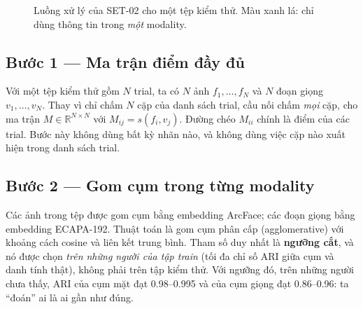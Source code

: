 \documentclass[11pt,a4paper]{article}
\newcommand{\key}[1]{\textbf{\color{accent}#1}}
\begin{document}
\begin{figure}[h]
\centering
{}
\caption{Luồng xử lý của SET-02 cho một tệp kiểm thử. Màu xanh lá: chỉ dùng thông tin trong \emph{một} modality.}
\end{figure}

\subsection{Bước 1 --- Ma trận điểm đầy đủ}
Với một tệp kiểm thử gồm $N$ trial, ta có $N$ ảnh $f_1,\dots,f_N$ và $N$ đoạn giọng $v_1,\dots,v_N$. Thay vì chỉ chấm $N$ cặp của danh sách trial, cầu nối chấm \emph{mọi} cặp, cho ma trận $M\in\mathbb{R}^{N\times N}$ với $M_{ij}=s(f_i,v_j)$. Đường chéo $M_{ii}$ chính là điểm của các trial. Bước này không dùng bất kỳ nhãn nào, và không dùng việc cặp nào xuất hiện trong danh sách trial.

\subsection{Bước 2 --- Gom cụm trong từng modality}
Các ảnh trong tệp được gom cụm bằng embedding ArcFace; các đoạn giọng bằng embedding ECAPA-192. Thuật toán là gom cụm phân cấp (agglomerative) với khoảng cách cosine và liên kết trung bình. Tham số duy nhất là \key{ngưỡng cắt}, và nó được chọn \emph{trên những người của tập train} (tối đa chỉ số ARI giữa cụm và danh tính thật), không phải trên tập kiểm thử. Với ngưỡng đó, trên những người chưa thấy, ARI của cụm mặt đạt 0.98--0.995 và của cụm giọng đạt 0.86--0.96: ta ``đoán'' ai là ai gần như đúng.
\end{document}
